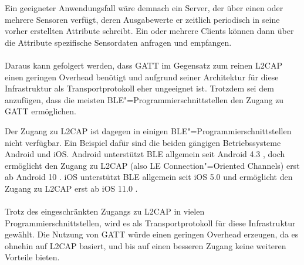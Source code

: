 Ein geeigneter Anwendungsfall wäre demnach ein Server, der über einen oder mehrere Sensoren verfügt, deren Ausgabewerte er zeitlich periodisch in seine vorher erstellten Attribute schreibt. Ein oder mehrere Clients können dann über die Attribute spezifische Sensordaten anfragen und empfangen.
\\\\
Daraus kann gefolgert werden, dass GATT im Gegensatz zum reinen L2CAP einen geringen Overhead benötigt und aufgrund seiner Architektur für diese Infrastruktur als Transportprotokoll eher ungeeignet ist. Trotzdem sei dem anzufügen, dass die meisten BLE"=Programmierschnittstellen den Zugang zu GATT ermöglichen.

Der Zugang zu L2CAP ist dagegen in einigen BLE"=Programmierschnittstellen nicht verfügbar. Ein Beispiel dafür sind die beiden gängigen Betriebssysteme Android und iOS. Android unterstützt BLE allgemein seit Android 4.3 \cite{AndroidAppLayerSec}, doch ermöglicht den Zugang zu L2CAP (also LE Connection"=Oriented Channels) erst ab Android 10 \cite{AndroidCoC}. iOS unterstützt BLE allgemein seit iOS 5.0 \cite{iOS_coreBluetooth} und ermöglicht den Zugang zu L2CAP erst ab iOS 11.0 \cite{iOS_CBL2CAPChannel}.
\\\\
Trotz des eingeschränkten Zugangs zu L2CAP in vielen Programmierschnittstellen, wird es als Transportprotokoll für diese Infrastruktur gewählt. Die Nutzung von GATT würde einen geringen Overhead erzeugen, da es ohnehin auf L2CAP basiert, und bis auf einen besseren Zugang keine weiteren Vorteile bieten.